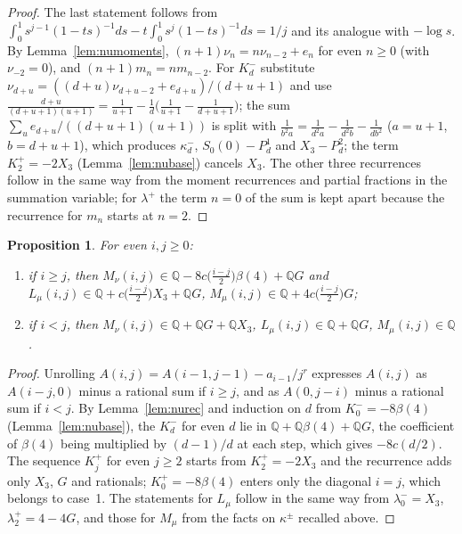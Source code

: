 \documentclass[11pt]{article}
\newtheorem{proposition}[theorem]{Proposition}
\theoremstyle{definition}
\begin{document}
\begin{proof}
The last statement follows from $\int_0^1 s^{j-1}(1-ts)^{-1}ds-t\int_0^1s^{j}(1-ts)^{-1}ds=1/j$ and its analogue with $-\log s$. By Lemma~\ref{lem:numoments}, $(n+1)\nu_n=n\nu_{n-2}+e_n$ for even $n\ge0$ (with $\nu_{-2}=0$), and $(n+1)m_n=nm_{n-2}$. For $K^-_d$ substitute $\nu_{d+u}=((d+u)\nu_{d+u-2}+e_{d+u})/(d+u+1)$ and use $\frac{d+u}{(d+u+1)(u+1)}=\frac1{u+1}-\frac1d\big(\frac1{u+1}-\frac1{d+u+1}\big)$; the sum $\sum_u e_{d+u}/((d+u+1)(u+1))$ is split with $\frac1{b^2a}=\frac1{d^2a}-\frac1{d^2b}-\frac1{db^2}$ ($a=u+1$, $b=d+u+1$), which produces $\kappa^-_d$, $S_0(0)-P^1_d$ and $X_3-P^2_d$; the term $K^+_2=-2X_3$ (Lemma~\ref{lem:nubase}) cancels $X_3$. The other three recurrences follow in the same way from the moment recurrences and partial fractions in the summation variable; for $\lambda^+$ the term $n=0$ of the sum is kept apart because the recurrence for $m_n$ starts at $n=2$.
\end{proof}

\begin{proposition}\label{prop:nuconst}
For even $i,j\ge0$:
\begin{enumerate}
\item if $i\ge j$, then $M_\nu(i,j)\in\mathbb Q-8c\big(\frac{i-j}2\big)\beta(4)+\mathbb QG$ and $L_\mu(i,j)\in\mathbb Q+c\big(\frac{i-j}2\big)X_3+\mathbb QG$, $M_\mu(i,j)\in\mathbb Q+4c\big(\frac{i-j}2\big)G$;
\item if $i<j$, then $M_\nu(i,j)\in\mathbb Q+\mathbb QG+\mathbb QX_3$, $L_\mu(i,j)\in\mathbb Q+\mathbb QG$, $M_\mu(i,j)\in\mathbb Q$.
\end{enumerate}
\end{proposition}

\begin{proof}
Unrolling $A(i,j)=A(i-1,j-1)-a_{i-1}/j^r$ expresses $A(i,j)$ as $A(i-j,0)$ minus a rational sum if $i\ge j$, and as $A(0,j-i)$ minus a rational sum if $i<j$. By Lemma~\ref{lem:nurec} and induction on $d$ from $K^-_0=-8\beta(4)$ (Lemma~\ref{lem:nubase}), the $K^-_d$ for even $d$ lie in $\mathbb Q+\mathbb Q\beta(4)+\mathbb QG$, the coefficient of $\beta(4)$ being multiplied by $(d-1)/d$ at each step, which gives $-8c(d/2)$. The sequence $K^+_j$ for even $j\ge2$ starts from $K^+_2=-2X_3$ and the recurrence adds only $X_3$, $G$ and rationals; $K^+_0=-8\beta(4)$ enters only the diagonal $i=j$, which belongs to case~1. The statements for $L_\mu$ follow in the same way from $\lambda^-_0=X_3$, $\lambda^+_2=4-4G$, and those for $M_\mu$ from the facts on $\kappa^\pm$ recalled above.
\end{proof}
\end{document}
